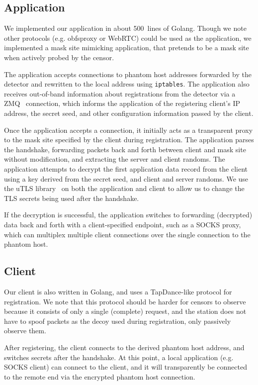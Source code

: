 \documentclass[letterpaper,twocolumn,10pt]{article}
\begin{document}
\subsection{Application}

We implemented our application in about 500~lines of Golang. Though we note
other protocols (e.g. obfsproxy or WebRTC) could be used as the application, we
implemented a mask site mimicking application, that pretends to be a mask site
when actively probed by the censor.

The application accepts connections to phantom host addresses forwarded by the
detector and rewritten to the local address using \texttt{iptables}.
The application also receives out-of-band information about registrations from the
detector via a ZMQ~\cite{zmq} connection, which informs the application of the
registering client's IP address, the secret seed, and other configuration
information passed by the client.

Once the application accepts a connection, it initially acts as a transparent
proxy to the mask site specified by the client during registration. The
application parses the handshake, forwarding packets back and forth between
client and mask site without modification, and extracting the server and client
randoms. The application attempts to decrypt the first application data record
from the client using a key derived from the secret seed, and client and server
randoms. We use the uTLS library~\cite{utls} on both the application and client
to allow us to change the TLS secrets being used after the handshake.

If the decryption is successful, the application switches to forwarding
(decrypted) data back and forth with a client-specified endpoint, such as a
SOCKS proxy, which can multiplex multiple client connections over the single
connection to the phantom host.

\subsection{Client}

Our client is also written in Golang, and uses a TapDance-like protocol for
registration. We note that this protocol should be harder for censors to observe
because it consists of only a single (complete) request, and the station does
not have to spoof packets as the decoy used during registration, only passively
observe them.

After registering, the client connects to the derived phantom host address, and
switches secrets after the handshake. At this point, a local application (e.g.
SOCKS client) can connect to the client, and it will transparently be connected to
the remote end via the encrypted phantom host connection.
\end{document}
